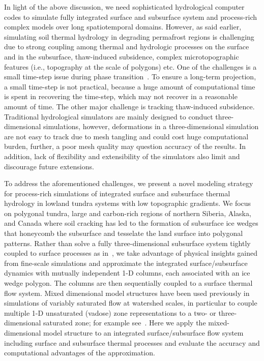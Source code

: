\documentclass[review]{elsarticle}
\begin{document}
In light of the above discussion, we need sophisticated hydrological computer codes to simulate fully integrated surface and subsurface system and process-rich complex models over long spatiotemporal domains. However, as said earlier, simulating soil thermal hydrology in degrading permafrost regions is challenging due to strong coupling among thermal and hydrologic processes on the surface and in the subsurface, thaw-induced subsidence, complex microtopographic features (i.e., topography at the scale of polygons) etc. One of the challenges is a small time-step issue during phase transition~\cite{dall2011robust}. To ensure a long-term projection, a small time-step is not practical, because a huge amount of computational time is spent in recovering the time-step, which may not recover in a reasonable amount of time. The other major challenge is tracking thaw-induced subsidence. Traditional hydrological simulators are mainly designed to conduct three-dimensional simulations, however, deformations in a three-dimensional simulation are not easy to track due to mesh tangling and could cost huge computational burden, further, a poor mesh quality may question accuracy of the results. In addition, lack of flexibility and extensibility of the simulators also limit and discourage future extensions.

To address the aforementioned challenges, we present a novel modeling strategy for process-rich simulations of integrated surface and subsurface thermal hydrology in lowland tundra systems with low topographic gradients. We focus on polygonal tundra, large and carbon-rich regions of northern Siberia, Alaska, and Canada where soil cracking has led to the formation of subsurface ice wedges that honeycomb the subsurface and tesselate the land surface into polygonal patterns. Rather than solve a fully three-dimensional subsurface system tightly coupled to surface processes as in~\cite{spainter2016integrated}, we take advantage of physical insights gained from fine-scale simulations and approximate the integrated surface/subsurface dynamics with mutually independent 1-D columns, each associated with an ice wedge polygon. The columns are then sequentially coupled to a surface thermal flow system. Mixed dimensional model structures have been used previously in simulations of variably saturated flow at watershed scales, in particular to couple multiple 1-D unsaturated (vadose) zone representations to a two- or three-dimensional saturated zone; for example see~\cite{pikul1974numerical,zhu2011method}. Here we apply the mixed-dimensional model structure to an integrated surface/subsurface flow system including surface and subsurface thermal processes and evaluate the accuracy and computational advantages of the approximation. 
\end{document}

